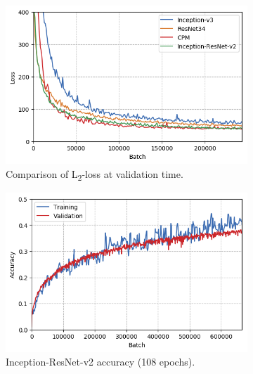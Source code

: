 \begin{figure}
    \begin{subfigure}[t]{0.34\textwidth}
    	\centering
        \includegraphics[width=\textwidth]{img/compare_test_loss}
        \vspace*{-.5\baselineskip}
        \caption{Comparison of L\textsubscript{2}-loss at validation time.\label{fig:compare_test_loss}}
    \end{subfigure}%
    \hfill
    \begin{subfigure}[t]{0.34\textwidth}
        \centering
        \includegraphics[width=\textwidth]{img/incres_all_acc}
        \vspace*{-.5\baselineskip}
        \caption{Inception-ResNet-v2 accuracy (108 epochs).\label{fig:best_acc}}
    \end{subfigure}%
    \enspace
    \begin{subfigure}[t]{0.34\textwidth}
    	\centering

\end{subfigure}
\end{figure}
